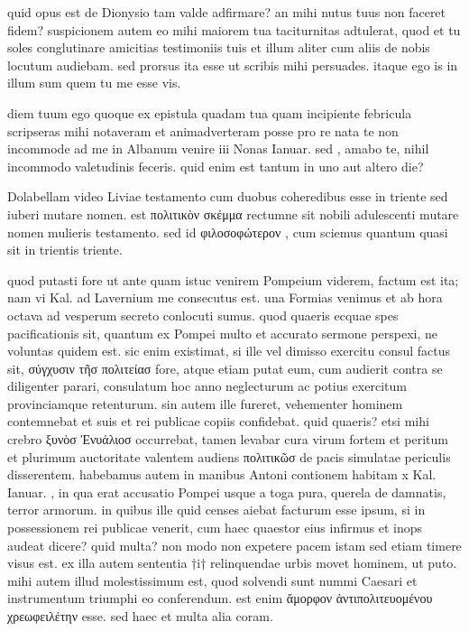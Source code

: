 


 quid opus est de Dionysio tam valde adfirmare? an mihi nutus tuus non faceret fidem? suspicionem autem eo mihi maiorem tua taciturnitas adtulerat, quod et tu soles conglutinare amicitias testimoniis tuis et illum aliter cum aliis de nobis locutum audiebam. sed prorsus ita esse ut scribis mihi persuades. itaque ego is in illum sum quem tu me esse vis.

 diem tuum ego quoque ex epistula quadam tua quam incipiente febricula scripseras mihi notaveram et animadverteram posse pro re nata te non incommode ad me in Albanum venire iii Nonas Ianuar. sed , amabo te, nihil incommodo valetudinis feceris. quid enim est tantum in uno aut altero die?

 Dolabellam video Liviae testamento cum duobus coheredibus esse in triente sed iuberi mutare nomen. est πολιτικὸν σκέμμα rectumne sit nobili adulescenti mutare nomen mulieris testamento. sed id φιλοσοφώτερον , cum sciemus quantum quasi sit in trientis triente.

 quod putasti fore ut ante quam istuc venirem Pompeium viderem, factum est ita; nam vi Kal. ad Lavernium me consecutus est. una Formias venimus et ab hora octava ad vesperum secreto conlocuti sumus. quod quaeris ecquae spes pacificationis sit, quantum ex Pompei multo et accurato sermone perspexi, ne voluntas quidem est. sic enim existimat, si ille vel dimisso exercitu consul factus sit, σύγχυσιν τῆσ πολιτείασ fore, atque etiam putat eum, cum audierit contra se diligenter parari, consulatum hoc anno neglecturum ac potius exercitum provinciamque retenturum. sin autem ille fureret, vehementer hominem contemnebat et suis et rei publicae copiis confidebat. quid quaeris? etsi mihi crebro ξυνὸσ Ἐνυάλιοσ occurrebat, tamen levabar cura virum fortem et peritum et plurimum auctoritate valentem audiens πολιτικῶσ de pacis simulatae periculis disserentem. habebamus autem in manibus Antoni contionem habitam x Kal. Ianuar. , in qua erat accusatio Pompei usque a toga pura, querela de damnatis, terror armorum. in quibus ille quid censes aiebat facturum esse ipsum, si in possessionem rei publicae venerit, cum haec quaestor eius infirmus et inops audeat dicere? quid multa? non modo non expetere pacem istam sed etiam timere visus est. ex illa autem sententia †i† relinquendae urbis movet hominem, ut puto. mihi autem illud molestissimum est, quod solvendi sunt nummi Caesari et instrumentum triumphi eo conferendum. est enim ἄμορφον ἀντιπολιτευομένου χρεωφειλέτην esse. sed haec et multa alia coram.
